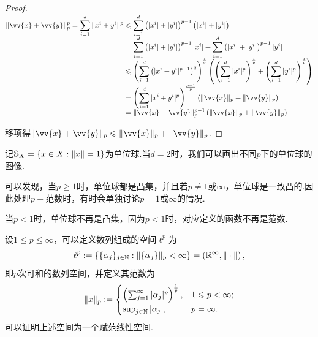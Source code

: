 \begin{instance}[$p-\!\!$范数]
\begin{proof}
        $\setjot[-2]\begin{aligned}[t]
            \|\vv{x}+\vv{y}\|_p^p=\sum_{i=1}^d\|x^i+y^i\|^p &\leq \sum_{i=1}^d\left(|x^i|+|y^i|\right)^{p-1}\left(|x^i|+|y^i|\right) \\
            &= \sum_{i=1}^d\left(|x^i|+|y^i|\right)^{p-1}|x^i|+\sum_{i=1}^d\left(|x^i|+|y^i|\right)^{p-1}|y^i| \\
            &\leq \left(\sum_{i=1}^d\left(|x^i+y^i|^{p-1}\right)^q\right)^\frac{1}{q}\left(\left(\sum_{i=1}^d|x^i|^p\right)^\frac{1}{p}+\left(\sum_{i=1}^d|y^i|^p\right)^\frac{1}{p}\right) \\
            &=\left(\sum_{i=1}^d|x^i+y^i|^p\right)^\frac{p-1}{p}\left(\|\vv{x}\|_p+\|\vv{y}\|_p\right) \\
            &=\|\vv{x}+\vv{y}\|_p^{p-1}\left(\|\vv{x}\|_p+\|\vv{y}\|_p\right)
        \end{aligned}$\par
        移项得$\|\vv{x}+\vv{y}\|_p\leq \|\vv{x}\|_p+\|\vv{y}\|_p$.
    \end{proof}\par
    记$\mathbb{S}_X=\{x\in X:\|x\|=1\}$为单位球.当$d=2$时，我们可以画出不同$p$下的单位球的图像.\par
    \begin{figure}[H]
        \centering
        \vspace{-1 em}
        
    \end{figure}
    可以发现，当$p\geq 1$时，单位球都是凸集，并且若$p\neq 1$或$\infty$，单位球是一致凸的.因此处理$p-$范数时，有时会单独讨论$p=1$或$\infty$的情况.\par
    当$p<1$时，单位球不再是凸集，因为$p<1$时，对应定义的函数不再是范数.\par
\end{instance}

\begin{instance}[$\ell^p$空间]
    设$1\leq p\leq \infty$，可以定义数列组成的空间$\ell^p$为
    \begin{equation*}
    \ell^p:=\left\{\{\alpha_j\}_{j\in\mathbb{N}}:\|\{\alpha_j\}\|_p<\infty\right\}=\left(\mathbb{R}^\infty,\|\cdot\|\right),
    \end{equation*}
    即$p$次可和的数列空间，并定义其范数为
    \begin{equation*}
        \|x\|_p:=\begin{cases}
        \left(\sum_{j=1}^\infty|\alpha_j|^p\right)^{\frac{1}{p}},&1\leqslant p<\infty;\\
        \sup_{j\in\mathbb{N}}|\alpha_j|,&p=\infty.
    \end{cases}
    \end{equation*}
    可以证明上述空间为一个赋范线性空间.
\end{instance}

